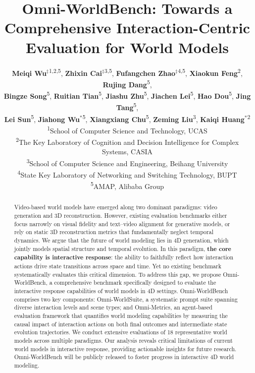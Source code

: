 \documentclass{article}
\title{Omni-WorldBench: Towards a Comprehensive Interaction-Centric Evaluation for World Models}
\author{%
  \textbf{Meiqi Wu}{$^\ddagger$}\textsuperscript{\rm1,\rm2,\rm5},
  \textbf{Zhixin Cai}{$^\ddagger$}\textsuperscript{\rm3,\rm5},
  \textbf{Fufangchen Zhao}{$^\ddagger$}\textsuperscript{\rm4,\rm5},
  \textbf{Xiaokun Feng}\textsuperscript{\rm2},
  \textbf{Rujing Dang}\textsuperscript{\rm5}, \\
  \textbf{Bingze Song}\textsuperscript{\rm5},
  \textbf{Ruitian Tian}\textsuperscript{\rm5},
  \textbf{Jiashu Zhu}\textsuperscript{\rm5},
  \textbf{Jiachen Lei}\textsuperscript{\rm5},
  \textbf{Hao Dou}\textsuperscript{\rm5},
  \textbf{Jing Tang}\textsuperscript{\rm5}, \\
  \textbf{Lei Sun}\textsuperscript{\rm5},
  \textbf{Jiahong Wu}{$^*$}\textsuperscript{\rm5},
  \textbf{Xiangxiang Chu}\textsuperscript{\rm5},
  \textbf{Zeming Liu}\textsuperscript{\rm3},
  \textbf{Kaiqi Huang}{$^*$}\textsuperscript{\rm2}
  \\
  \textsuperscript{\rm1}School of Computer Science and Technology, UCAS \\
  \textsuperscript{\rm2}The Key Laboratory of Cognition and Decision Intelligence for Complex Systems, CASIA \\
  \textsuperscript{\rm3}School of Computer Science and Engineering, Beihang University \\
  \textsuperscript{\rm4}State Key Laboratory of Networking and Switching Technology, BUPT \\
  \textsuperscript{\rm5}AMAP, Alibaba Group
\\
}
\begin{document}

\maketitle
\def\thefootnote{$\ddagger$}
\def\thefootnote{$*$}
\begin{abstract}

Video-based world models have emerged along two dominant paradigms: video generation and 3D reconstruction. However, existing evaluation benchmarks either focus narrowly on visual fidelity and text–video alignment for generative models, or rely on static 3D reconstruction metrics that fundamentally neglect temporal dynamics. We argue that the future of world modeling lies in 4D generation, which jointly models spatial structure and temporal evolution. In this paradigm, \textbf{the core capability is interactive response}: the ability to faithfully reflect how interaction actions drive state transitions across space and time. Yet no existing benchmark systematically evaluates this critical dimension.
To address this gap, we propose Omni-WorldBench, a comprehensive benchmark specifically designed to evaluate the interactive response capabilities of world models in 4D settings. Omni-WorldBench comprises two key components: Omni-WorldSuite, a systematic prompt suite spanning diverse interaction levels and scene types; and Omni-Metrics, an agent-based evaluation framework that quantifies world modeling capabilities by measuring the causal impact of interaction actions on both final outcomes and intermediate state evolution trajectories. We conduct extensive evaluations of 18 representative world models across multiple paradigms. Our analysis reveals critical limitations of current world models in interactive response, providing actionable insights for future research. Omni-WorldBench will be publicly released to foster progress in interactive 4D world modeling.


\end{abstract}
\end{document}
